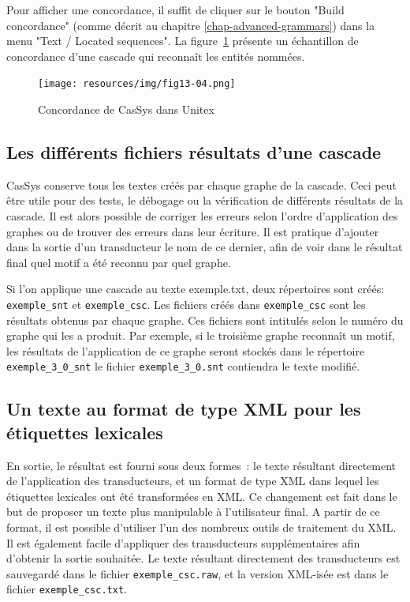 \bigskip
\noindent Pour afficher une concordance, il suffit de cliquer sur le bouton "Build concordance"
(comme décrit au chapitre \ref{chap-advanced-grammars}) dans la menu "Text / Located sequences".
La figure~\ref{fig13-04} présente un échantillon de concordance d'une cascade qui reconnaît les entités
nommées.


\begin{figure}[!htb]
  \centering
  \texttt{[image: resources/img/fig13-04.png]}
  \caption{Concordance de CasSys dans Unitex}
  \label{fig13-04}
\end{figure}

\subsection{Les différents fichiers résultats d'une cascade}

CasSys conserve tous les textes créés par chaque graphe  de la cascade. Ceci peut être
utile  pour des tests, le débogage ou la vérification de différents résultats de la cascade. Il est
alors possible de corriger les erreurs selon l'ordre d'application des graphes ou de trouver des
erreurs dans leur écriture. Il est pratique d'ajouter dans la sortie d'un transducteur le nom de ce
dernier, afin de voir dans le résultat final quel motif a été reconnu par quel graphe.

Si l'on applique une cascade au texte exemple.txt, deux répertoires sont créés:
\verb+exemple_snt+ et \verb+exemple_csc+.
Les fichiers créés dans \verb+exemple_csc+ sont les résultats obtenus par
chaque graphe. Ces fichiers sont intitulés selon le numéro du graphe qui les a produit. Par exemple, si le
troisième graphe reconnaît un motif, les résultats de l'application de ce graphe seront stockés dans le 
répertoire  \verb+exemple_3+\newline\verb+_0_snt+ le fichier \verb+exemple_3_0.snt+ contiendra le texte modifié.

\subsection{Un texte au format de type XML pour les étiquettes lexicales}

En sortie, le résultat est fourni sous deux formes~: le texte résultant directement de l'application des transducteurs, et un format de type XML dans lequel les étiquettes lexicales ont été transformées en XML.
Ce changement est fait dans le but de proposer un texte plus manipulable  à l'utilisateur final.
A partir de ce format, il est possible d'utiliser l'un des nombreux outils de traitement du XML.
Il est également facile d'appliquer des transducteurs supplémentaires afin d'obtenir la sortie souhaitée.
Le texte résultant directement des transducteurs est sauvegardé dans le fichier  \verb+exemple_csc.raw+, et la version  XML-isée est dans le fichier \verb+exemple_csc.txt+.

